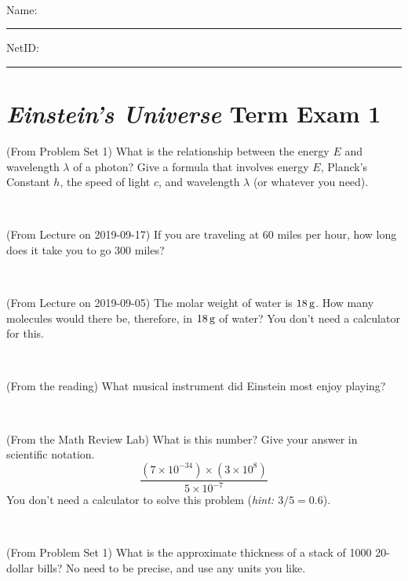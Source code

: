\documentclass[12pt, letterpaper]{article}
\begin{document}
\vfill ~


\cleardoublepage



\noindent
Name: \rule[-1ex]{0.60\textwidth}{0.1pt}
NetID: \rule[-1ex]{0.20\textwidth}{0.1pt}

\section*{\textsl{Einstein's Universe} Term Exam 1}
\setcounter{problem}{1}


\begin{problem} (From Problem Set 1)
What is the relationship between the energy $E$ and wavelength
$\lambda$ of a photon? Give a formula that involves energy $E$,
Planck's Constant $h$, the speed of light $c$, and wavelength
$\lambda$ (or whatever you need).
\end{problem}

\vfill ~

\begin{problem} (From Lecture on 2019-09-17)
If you are traveling at 60 miles per hour, how long does
it take you to go 300 miles?
\end{problem}


\vfill ~

\begin{problem} (From Lecture on 2019-09-05)
The molar weight of water is $18\,\mathrm{g}$. How many molecules would there
be, therefore, in $18\,\mathrm{g}$ of water? You don't need a calculator for
this.
\end{problem}


\vfill ~

\begin{problem} (From the reading)
What musical instrument did Einstein most enjoy playing?
\end{problem}


\vfill ~


\clearpage


\begin{problem} (From the Math Review Lab)
What is this number? Give your answer in scientific notation.
$$
\frac{(7\times10^{-34})\times(3\times10^8)}{5\times10^{-7}}
$$
You don't need a calculator to solve this problem (\textit{hint: $3/5=0.6$}).
\end{problem}


\vfill ~

\begin{problem} (From Problem Set 1)
What is the approximate thickness of a stack of 1000 20-dollar bills?
No need to be precise, and use any units you like.
\end{problem}
\end{document}
